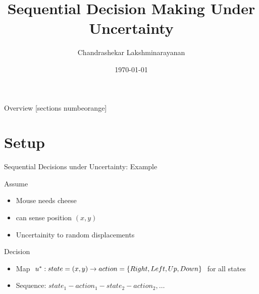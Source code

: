 \documentclass[10pt,handout]{beamer}
\title{Sequential Decision Making Under Uncertainty}
\date{\today}
\author{Chandrashekar Lakshminarayanan}
\institute{Reinforcement Learning \& Artificial Intelligence Group,\\University of Alberta}
\begin{document}
\maketitle

\begin{frame}{Overview}
  [sections numbeorange]
  \tableofcontents[hideallsubsections]
\end{frame}
\section{Setup}
\begin{frame}[fragile]{Sequential Decisions under Uncertainty: Example}
\color{black}
\begin{block}{Assume}
\begin{itemize}
\item Mouse needs cheese
\item can sense position $(x,y)$
\item Uncertainity to random displacements
\end{itemize}
\end{block}
\begin{block}{Decision}
\begin{itemize}
\item Map $u^*: state=(x,y)\rightarrow action=\{Right,Left,Up,Down\}$ for all states
\item Sequence: $state_1-action_1-state_2-action_2,\ldots$
\end{itemize}
\end{block}


\end{frame}
\end{document}
